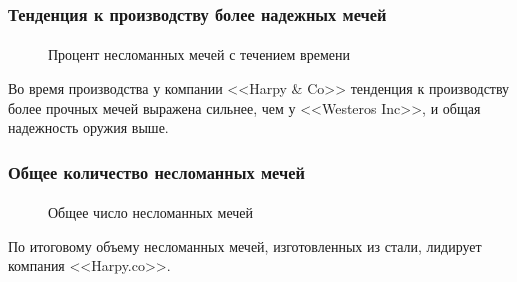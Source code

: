\documentclass[10pt,pdf,hyperref={unicode}]{beamer}
\begin{document}
\begin{frame}
\frametitle{Тенденция к производству более надежных мечей} 
\framesubtitle{}

\begin{minipage}{0.4\textwidth}
 	\begin{figure}[L]
		\caption{Процент несломанных мечей с течением времени}		
	\end{figure}
\end{minipage}
\hfill
\begin{minipage}{0.4\textwidth}
	Во время производства у компании <<Harpy \& Co>> тенденция к производству более прочных мечей выражена сильнее, чем у <<Westeros Inc>>, и общая надежность оружия выше. 
\end{minipage}
\end{frame}


\begin{frame}
\frametitle{Общее количество несломанных мечей} 
\framesubtitle{}

\begin{minipage}{0.4\textwidth}
 	\begin{figure}[L]
		\caption{Общее число несломанных мечей}	
	\end{figure}
\end{minipage}
\hfill
\begin{minipage}{0.4\textwidth}
	По итоговому объему несломанных мечей, изготовленных из стали, лидирует компания <<Harpy.co>>. 
\end{minipage}
\end{frame}
\end{document}
